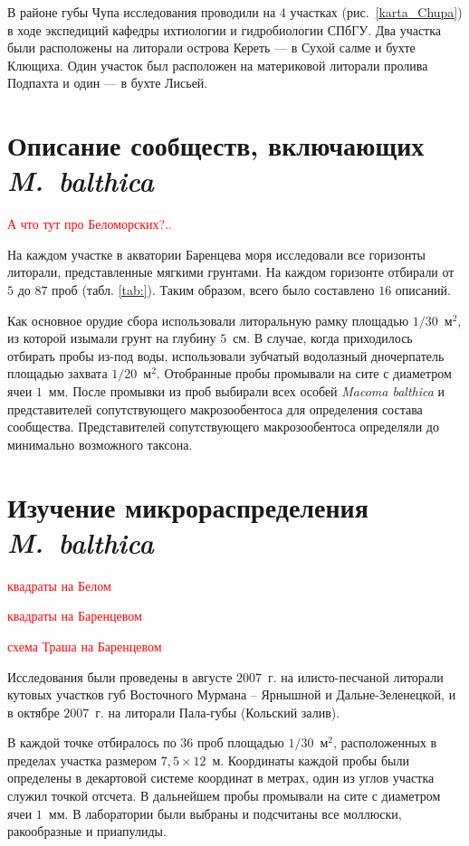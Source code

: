 \documentclass[12pt, a4paper]{disser}
\begin{document}
В районе губы Чупа исследования проводили на $4$ участках (рис.~\ref{karta_Chupa}) в ходе экспедиций кафедры ихтиологии и гидробиологии СПбГУ. 
Два участка были расположены на литорали острова Кереть --- в Сухой салме и бухте Клющиха. 
Один участок был расположен на материковой литорали пролива Подпахта и один --- в бухте Лисьей.


	\section{Описание сообществ, включающих {\it M.~balthica}}
\textcolor{red}{А что тут про Беломорских?..}

  На каждом участке в акватории Баренцева моря исследовали все  горизонты литорали, представленные мягкими грунтами.  
На каждом горизонте отбирали от $5$ до $87$ проб  (табл.  \ref{tab:}). Таким образом, всего было составлено $16$ описаний.

Как основное орудие сбора использовали литоральную рамку площадью $1/30$~м$^2$, из которой изымали грунт на глубину $5$~см. 
В случае, когда приходилось отбирать пробы из-под воды, использовали зубчатый водолазный дночерпатель площадью захвата $1/20$~м$^2$.
Отобранные пробы промывали на сите с диаметром ячеи $1$~мм. 
После промывки из   проб   выбирали   всех   особей  {\it Macoma   balthica}  и   представителей   сопутствующего макрозообентоса    для   определения   состава   сообщества.
   Представителей   сопутствующего макрозообентоса  определяли   до   минимально   возможного   таксона.



	\section{Изучение микрораспределения {\it M.~balthica}}

\textcolor{red}{квадраты на Белом}

\textcolor{red}{квадраты на Баренцевом}

\textcolor{red}{схема Траша на Баренцевом}

Исследования были проведены в августе $2007$~г. на илисто-песчаной литорали кутовых участков губ Восточного Мурмана – Ярнышной и Дальне-Зеленецкой, и в октябре $2007$~г. на литорали Пала-губы (Кольский залив). 

В каждой точке отбиралось по $36$ проб площадью $1/30$~м$^2$, расположенных в пределах участка размером $7,5 \times 12$~м. 
Координаты каждой пробы были определены в декартовой системе координат в метрах, один из углов участка служил точкой отсчета. 
В дальнейшем пробы промывали на сите с диаметром ячеи $1$~мм. 
В лаборатории были выбраны и  подсчитаны все моллюски, ракообразные и приапулиды.
\end{document}
